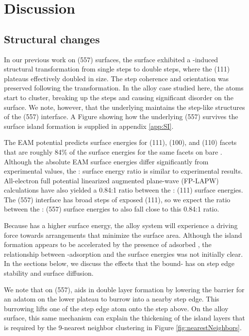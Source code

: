 \section{Discussion}

\subsection{Structural changes}

In our previous work on (557) surfaces,\citep{Michalka:2013aa} the
surface exhibited a -induced structural transformation from
single steps to double steps, where the (111) plateaus effectively
doubled in size. The step coherence and orientation was preserved
following the transformation.  In the alloy case studied here, the
 atoms start to cluster, breaking up the steps and causing
significant disorder on the surface.  We note, however, that the
underlying  maintains the step-like structures of the (557)
interface.  A Figure showing how the underlying (557) survives
the surface island formation is supplied in appendix \ref{app:SI}.


The EAM potential predicts surface energies for  (111), (100),
and (110) facets that are roughly 84\% of the surface energies for the
same facets on bare .\citep{Foiles:1986ky} Although the absolute EAM
surface energies differ significantly from experimental values, the
: surface energy ratio is similar to experimental
results.\citep{Tyson:1977xe, De-Boer:1988tg} All-electron full potential
linearized augmented plane-wave (FP-LAPW) calculations have also
yielded a 0.84:1 ratio between the : (111) surface
energies.\citep{Silva:2006fk} The (557) interface has broad steps of
exposed (111), so we expect the ratio between the :
(557) surface energies to also fall close to this 0.84:1 ratio.

Because  has a higher surface energy, the alloy system will
experience a driving force towards arrangements that minimize the
 surface area.  Although the  island formation appears
to be accelerated by the presence of adsorbed , the
relationship between -adsorption and the surface energies was
not initially clear. In the sections below, we discuss the effects
that the bound- has on step edge stability and surface
diffusion.

We note that on (557),  aids in double layer formation
by lowering the barrier for an adatom on the lower plateau to burrow
into a nearby step edge.\citep{Michalka:2013aa} This burrowing lifts one
of the step edge atom onto the step above.  On the alloy surface, this
same mechanism can explain the thickening of the  island layers
that is required by the 9-nearest neighbor clustering in
Figure \ref{fig:nearestNeighbors}.

